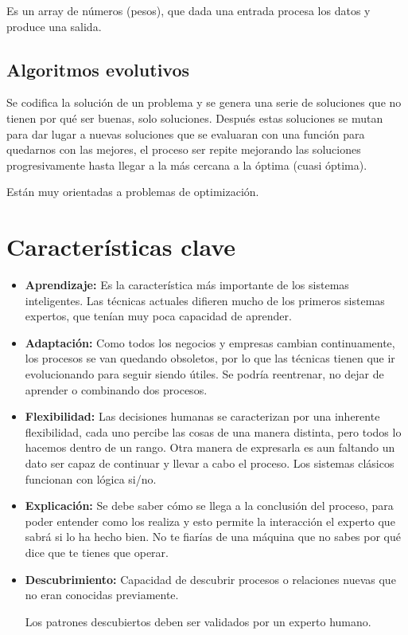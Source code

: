 \documentclass[12pt, twoside, openright]{report} %
\begin{document}
Es un array de números (pesos), que dada una entrada procesa los datos y produce una salida.

\subsection{Algoritmos evolutivos}
Se codifica la solución de un problema y se genera una serie de soluciones que no tienen por qué ser buenas, solo soluciones. Después estas soluciones se mutan para dar lugar a nuevas soluciones que se evaluaran con una función para quedarnos con las mejores, el proceso ser repite mejorando las soluciones progresivamente hasta llegar a la más cercana a la óptima (cuasi óptima).

Están muy orientadas a problemas de optimización.

\section{Características clave}
\begin{itemize}
	\item \textbf{Aprendizaje:} Es la característica más importante de los sistemas inteligentes. Las técnicas actuales difieren mucho de los primeros sistemas expertos, que tenían muy poca capacidad de aprender.
	\item \textbf{Adaptación:} Como todos los negocios y empresas cambian continuamente, los procesos se van quedando obsoletos, por lo que las técnicas tienen que ir evolucionando para seguir siendo útiles. Se podría reentrenar, no dejar de aprender o combinando dos procesos.
	\item \textbf{Flexibilidad:} Las decisiones humanas se caracterizan por una inherente flexibilidad, cada uno percibe las cosas de una manera distinta, pero todos lo hacemos dentro de un rango. Otra manera de expresarla es aun faltando un dato ser capaz de continuar y llevar a cabo el proceso. Los sistemas clásicos funcionan con lógica si/no.
	\item \textbf{Explicación:} Se debe saber cómo se llega a la conclusión del proceso, para poder entender como los realiza y esto permite la interacción el experto que sabrá si lo ha hecho bien. No te fiarías de una máquina que no sabes por qué dice que te tienes que operar.
	\item \textbf{Descubrimiento:} Capacidad de descubrir procesos o relaciones nuevas que no eran conocidas previamente.
	      
	      Los patrones descubiertos deben ser validados por un experto humano.
\end{itemize}
\end{document}
